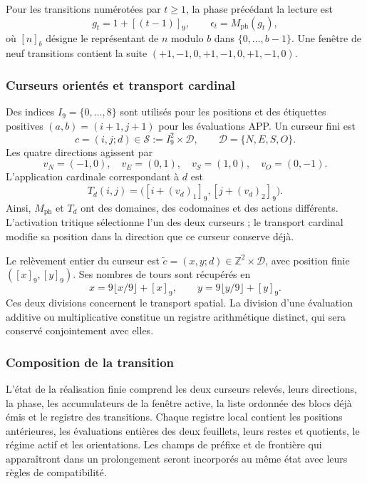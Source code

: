 Pour les transitions numérotées par \(t\geq1\), la phase précédant la lecture est
\begin{equation}
 g_t=1+[(t-1)]_9,\qquad \epsilon_t=M_{\mathrm{ph}}(g_t),
 \label{tpk:fase}
\end{equation}
où \([n]_b\) désigne le représentant de \(n\) modulo \(b\) dans
\(\{0,\ldots,b-1\}\). Une fenêtre de neuf transitions contient la suite
\((+1,-1,0,+1,-1,0,+1,-1,0)\).

\subsubsection{Curseurs orientés et transport cardinal}

Des indices \(I_9=\{0,\ldots,8\}\) sont utilisés pour les positions et des étiquettes positives \((a,b)=(i+1,j+1)\) pour les évaluations APP. Un curseur fini est
\[
 c=(i,j;d)\in\mathcal S:=I_9^2\times\mathcal D,
 \qquad \mathcal D=\{N,E,S,O\}.
\]
Les quatre directions agissent par
\[
 v_N=(-1,0),\quad v_E=(0,1),\quad
 v_S=(1,0),\quad v_O=(0,-1).
\]
L'application cardinale correspondant à \(d\) est
\[
 T_d(i,j)=\bigl([i+(v_d)_1]_9,[j+(v_d)_2]_9\bigr).
\]
Ainsi, \(M_{\mathrm{ph}}\) et \(T_d\) ont des domaines, des codomaines et des actions différents. L'activation tritique sélectionne l'un des deux curseurs ; le transport cardinal modifie sa position dans la direction que ce curseur conserve déjà.

Le relèvement entier du curseur est
\(\widetilde c=(x,y;d)\in\mathbb Z^2\times\mathcal D\), avec position finie
\(([x]_9,[y]_9)\). Ses nombres de tours sont récupérés en
\begin{equation}
 x=9\lfloor x/9\rfloor+[x]_9,\qquad
 y=9\lfloor y/9\rfloor+[y]_9.
 \label{tpk:vueltas}
\end{equation}
Ces deux divisions concernent le transport spatial. La division d'une
évaluation additive ou multiplicative constitue un registre arithmétique
distinct, qui sera conservé conjointement avec elles.

\subsubsection{Composition de la transition}

L'état de la réalisation finie comprend les deux curseurs relevés,
leurs directions, la phase, les accumulateurs de la fenêtre active, la liste
ordonnée des blocs déjà émis et le registre des transitions. Chaque registre
local contient les positions antérieures, les évaluations entières des deux
feuillets, leurs restes et quotients, le régime actif et les orientations.
Les champs de préfixe et de frontière qui apparaîtront dans un prolongement seront
incorporés au même état avec leurs règles de compatibilité.

